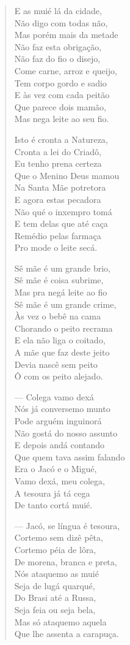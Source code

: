 \begin{verse}
E as muié lá da cidade,\\
Não digo com todas não,\\
Mas porém mais da metade\\
Não faz esta obrigação,\\
Não faz do fio o disejo,\\
Come carne, arroz e queijo,\\
Tem corpo gordo e sadio\\
E às vez com cada peitão\\
Que parece dois mamão,\\
Mas nega leite ao seu fio.

Isto é cronta a Natureza,\\
Cronta a lei do Criadô,\\
Eu tenho prena certeza\\
Que o Menino Deus mamou\\
Na Santa Mãe potretora\\
E agora estas pecadora\\
Não qué o inxempro tomá\\
E tem delas que até caça\\
Remédio pelas farmaça\\
Pro mode o leite secá.

Sê mãe é um grande brio,\\
Sê mãe é coisa subrime,\\
Mas pra negá leite ao fio\\
Sê mãe é um grande crime,\\
Às vez o bebê na cama\\
Chorando o peito recrama\\
E ela não liga o coitado,\\
A mãe que faz deste jeito\\
Devia nascê sem peito\\
Ô com os peito alejado.

--- Colega vamo dexá\\
Nós já conversemo munto\\
Pode arguém inguinorá\\
Não gostá do nosso assunto\\
E depois andá contando\\
Que quem tava assim falando\\
Era o Jacó e o Migué,\\
Vamo dexá, meu colega,\\
A tesoura já tá cega\\
De tanto cortá muié.

--- Jacó, se língua é tesoura,\\
Cortemo sem dizê pêta,\\
Cortemo péia de lôra,\\
De morena, branca e preta,\\
Nós ataquemo as muié\\
Seja de lugá quarqué,\\
Do Brasi até a Russa,\\
Seja feia ou seja bela,\\
Mas só ataquemo aquela\\
Que lhe assenta a carapuça.
\end{verse}

